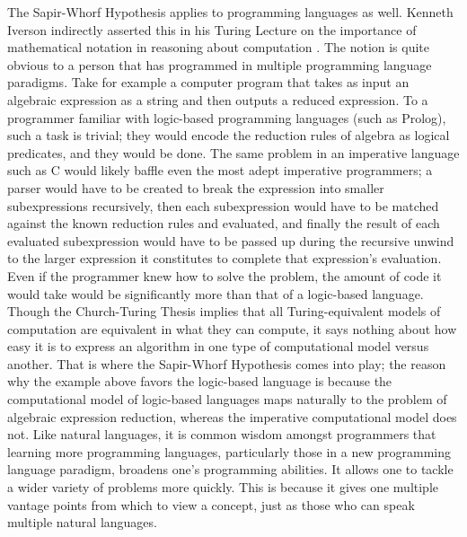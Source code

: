 The Sapir-Whorf Hypothesis applies to programming languages as well. Kenneth Iverson indirectly asserted this in his Turing Lecture on the importance of mathematical notation in reasoning about computation \citep{iverson:notationasatool}. The notion is quite obvious to a person that has programmed in multiple programming language paradigms. Take for example a computer program that takes as input an algebraic expression as a string and then outputs a reduced expression. To a programmer familiar with logic-based programming languages (such as Prolog), such a task is trivial; they would encode the reduction rules of algebra as logical predicates, and they would be done. The same problem in an imperative language such as C would likely baffle even the most adept imperative programmers; a parser would have to be created to break the expression into smaller subexpressions recursively, then each subexpression would have to be matched against the known reduction rules and evaluated, and finally the result of each evaluated subexpression would have to be passed up during the recursive unwind to the larger expression it constitutes to complete that expression's evaluation. Even if the programmer knew how to solve the problem, the amount of code it would take would be significantly more than that of a logic-based language. Though the Church-Turing Thesis implies that all Turing-equivalent models of computation are equivalent in what they can compute, it says nothing about how easy it is to express an algorithm in one type of computational model versus another. That is where the Sapir-Whorf Hypothesis comes into play; the reason why the example above favors the logic-based language is because the computational model of logic-based languages maps naturally to the problem of algebraic expression reduction, whereas the imperative computational model does not.  Like natural languages, it is common wisdom amongst programmers that learning more programming languages, particularly those in a new programming language paradigm, broadens one's programming abilities. It allows one to tackle a wider variety of problems more quickly. This is because it gives one multiple vantage points from which to view a concept, just as those who can speak multiple natural languages.

